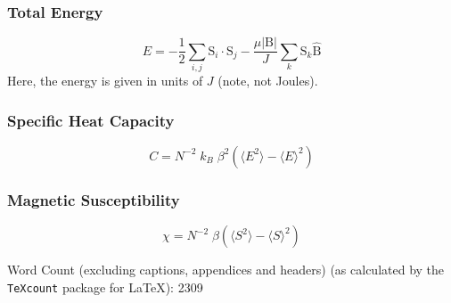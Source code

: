 \documentclass[11pt]{article}
\newcommand{\mathbold}[1]{\boldsymbol{\mathrm{#1}}}
\newcommand{\mean}[1]{\langle #1 \rangle}
\newcommand{\leftright}[1]{\left( #1 \right)}
\begin{document}
\subsubsection*{Total Energy}
\begin{equation}\label{eq:normE}
E = -\frac{1}{2}\sum_{i, j}\mathbold{S}_{i}\cdot\mathbold{S}_{j} - \frac{\mu |\mathbold{B}|}{J}\sum_{k}\mathbold{S}_{k}\mathbold{\hat{B}}
\end{equation}
Here, the energy is given in units of $J$ (note, not Joules).
\subsubsection*{Specific Heat Capacity}
\begin{equation}\label{eq:normC}
C = N^{-2}\;k_{B}\;\beta^{2} \leftright{\mean{E^{2}} - \mean{E}^{2}}
\end{equation}
\subsubsection*{Magnetic Susceptibility}
\begin{equation}\label{eq:normChi}
\chi = N^{-2}\;\beta \leftright{\mean{S^{2}} - \mean{S}^{2}}
\end{equation}

\noindent\makebox[\linewidth]{\rule{\textwidth}{0.4pt}}

Word Count (excluding captions, appendices and headers) (as calculated by the \texttt{TeXcount} package for \LaTeX ): 2309
\end{document}
